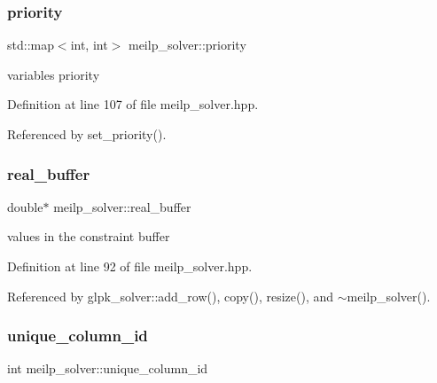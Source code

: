 \subsubsection{\texorpdfstring{priority}{priority}}
{\footnotesize\ttfamily std\+::map$<$int, int$>$ meilp\+\_\+solver\+::priority\hspace{0.3cm}{\ttfamily [protected]}}



variables priority 



Definition at line 107 of file meilp\+\_\+solver.\+hpp.



Referenced by set\+\_\+priority().

\mbox{\label{classmeilp__solver_a58182e78e73639b546873ad280000ea3}} 
\subsubsection{\texorpdfstring{real\+\_\+buffer}{real\_buffer}}
{\footnotesize\ttfamily double$\ast$ meilp\+\_\+solver\+::real\+\_\+buffer\hspace{0.3cm}{\ttfamily [protected]}}



values in the constraint buffer 



Definition at line 92 of file meilp\+\_\+solver.\+hpp.



Referenced by glpk\+\_\+solver\+::add\+\_\+row(), copy(), resize(), and $\sim$meilp\+\_\+solver().

\mbox{\label{classmeilp__solver_aa9606e3ca41bb53c9bb1bbc1d61d5a64}} 
\subsubsection{\texorpdfstring{unique\+\_\+column\+\_\+id}{unique\_column\_id}}
{\footnotesize\ttfamily int meilp\+\_\+solver\+::unique\+\_\+column\+\_\+id\hspace{0.3cm}{\ttfamily [protected]}}



